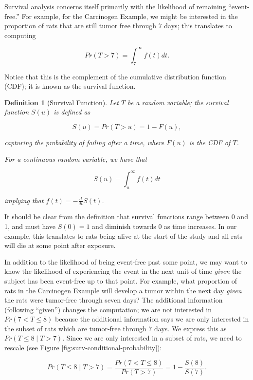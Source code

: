 \documentclass[
]{book}
\theoremstyle{plain}
\theoremstyle{mydefn}
\newtheorem{definition}{Definition}[chapter]
\theoremstyle{myexmpl}
\theoremstyle{remark}
\begin{document}
Survival analysis concerns itself primarily with the likelihood of remaining ``event-free.'' For example, for the Carcinogen Example, we might be interested in the proportion of rats that are still tumor free through 7 days; this translates to computing

\[Pr(T > 7) = \int_{7}^{\infty} f(t) dt.\]

Notice that this is the complement of the cumulative distribution function (CDF); it is known as the survival function.

\begin{definition}[Survival Function]
\protect\hypertarget{def:defn-survival}{}{\label{def:defn-survival} {} }Let \(T\) be a random variable; the survival function \(S(u)\) is defined as

\[S(u) = Pr(T > u) = 1 - F(u),\]

capturing the probability of failing \emph{after} a time, where \(F(u)\) is the CDF of \(T\).

For a continuous random variable, we have that

\[S(u) = \int_{u}^{\infty} f(t) dt\]

implying that \(f(t) = -\frac{d}{dt} S(t)\).
\end{definition}

It should be clear from the definition that survival functions range between 0 and 1, and must have \(S(0) = 1\) and diminish towards 0 as time increases. In our example, this translates to rats being alive at the start of the study and all rats will die at some point after exposure.

In addition to the likelihood of being event-free past some point, we may want to know the likelihood of experiencing the event in the next unit of time \emph{given} the subject has been event-free up to that point. For example, what proportion of rats in the Carcinogen Example will develop a tumor within the next day \emph{given} the rats were tumor-free through seven days? The additional information (following ``given'') changes the computation; we are not interested in \(Pr(7 < T \leq 8)\) because the additional information says we are only interested in the subset of rats which are tumor-free through 7 days. We express this as \(Pr(T \leq 8 \mid T > 7)\). Since we are only interested in a subset of rats, we need to rescale (see Figure \ref{fig:surv-conditional-probability}):

\[Pr(T \leq 8 \mid T > 7) = \frac{Pr(7 < T \leq 8)}{Pr(T > 7)} = 1 - \frac{S(8)}{S(7)}.\]
\end{document}
